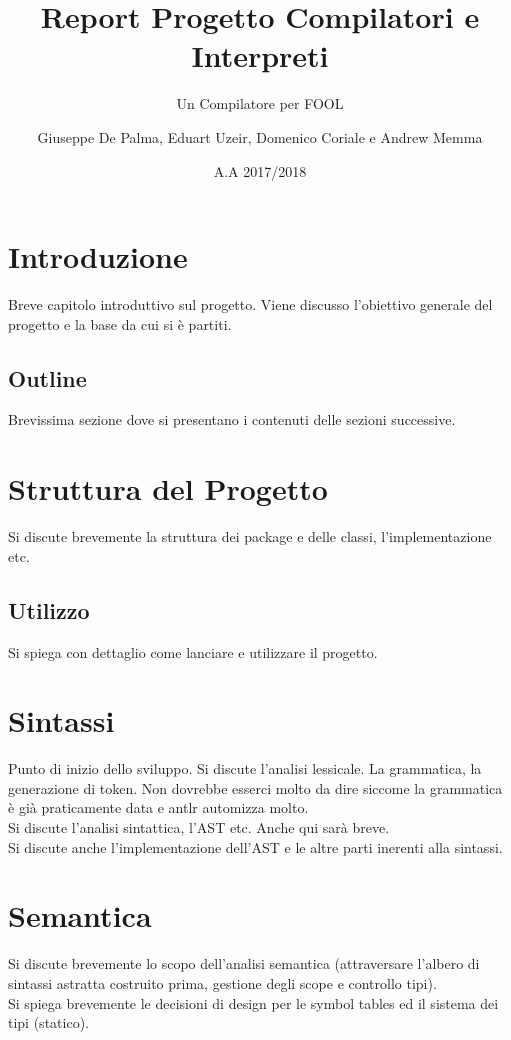 \documentclass{scrreprt}
\title{Report Progetto Compilatori e Interpreti}
\subtitle{Un Compilatore per FOOL}
\date{A.A 2017/2018}
\author{Giuseppe De Palma, Eduart Uzeir, Domenico Coriale e Andrew Memma}
\begin{document}
\maketitle

\tableofcontents

\chapter{Introduzione}
Breve capitolo introduttivo sul progetto. Viene discusso l'obiettivo generale del progetto e la base da cui si è partiti.

\section{Outline}
Brevissima sezione dove si presentano i contenuti delle sezioni successive.

\chapter{Struttura del Progetto}
Si discute brevemente la struttura dei package e delle classi, l'implementazione etc.
\section{Utilizzo}
Si spiega con dettaglio come lanciare e utilizzare il progetto.

\chapter{Sintassi}
Punto di inizio dello sviluppo. Si discute l'analisi lessicale. La grammatica, la generazione di token.
Non dovrebbe esserci molto da dire siccome la grammatica è già praticamente data e antlr automizza molto.\\
Si discute l'analisi sintattica, l'AST etc. Anche qui sarà breve.\\
Si discute anche l'implementazione dell'AST e le altre parti inerenti alla sintassi.

\chapter{Semantica}
Si discute brevemente lo scopo dell'analisi semantica (attraversare l'albero di sintassi astratta costruito prima, gestione
degli scope e controllo tipi).\\
Si spiega brevemente le decisioni di design per le symbol tables ed il sistema dei tipi (statico).
\end{document}
